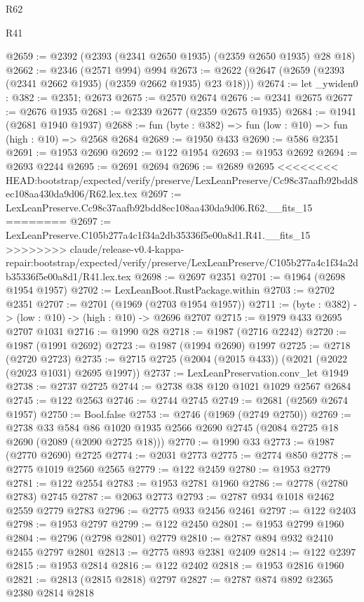 \begin{lexlean}{R62}
\begin{lexlean}{R41}
\begin{coremodule}
{{{{{{{{{{{{{{{{{{{{{{{{{{{{{{{{{{{{{{{{{{{{{{{{{{{{{{{{{{{{{{{{{{{{{{{{{{{{{{{{{{{{{{{@2659 := @2392 (@2393 (@2341 @2650 @1935) (@2359 @2650 @1935) @28 @18)
@2662 := @2346 (@2571 @994) @994
@2673 := @2622 (@2647 (@2659 (@2393 (@2341 @2662 @1935) (@2359 @2662 @1935) @23 @18)))
@2674 := let _ywiden0 : @382 := @2351; @2673
@2675 := @2570 @2674
@2676 := @2341 @2675
@2677 := @2676 @1935
@2681 := @2339 @2677 (@2359 @2675 @1935)
@2684 := @1941 (@2681 @1940 @1937)
@2688 := fun (byte : @382) => fun (low : @10) => fun (high : @10) => @2568 @2684
@2689 := @1950 @433
@2690 := @586 @2351
@2691 := @1953 @2690
@2692 := @122 @1954
@2693 := @1953 @2692
@2694 := @2693 @2244
@2695 := @2691 @2694
@2696 := @2689 @2695
<<<<<<<< HEAD:bootstrap/expected/verify/preserve/LexLeanPreserve/Cc98c37aafb92bdd8ec108aa430da9d06/R62.lex.tex
@2697 := LexLeanPreserve.Cc98c37aafb92bdd8ec108aa430da9d06.R62.__fits_15
========
@2697 := LexLeanPreserve.C105b277a4c1f34a2db35336f5e00a8d1.R41.__fits_15
>>>>>>>> claude/release-v0.4-kappa-repair:bootstrap/expected/verify/preserve/LexLeanPreserve/C105b277a4c1f34a2db35336f5e00a8d1/R41.lex.tex
@2698 := @2697 @2351
@2701 := @1964 (@2698 @1954 @1957)
@2702 := LexLeanBoot.RustPackage.within
@2703 := @2702 @2351
@2707 := @2701 (@1969 (@2703 @1954 @1957))
@2711 := (byte : @382) -> (low : @10) -> (high : @10) -> @2696 @2707
@2715 := @1979 @433 @2695 @2707 @1031
@2716 := @1990 @28
@2718 := @1987 (@2716 @2242)
@2720 := @1987 (@1991 @2692)
@2723 := @1987 (@1994 @2690) @1997
@2725 := @2718 (@2720 @2723)
@2735 := @2715 @2725 (@2004 (@2015 @433)) (@2021 (@2022 (@2023 @1031) @2695 @1997))
@2737 := LexLeanPreservation.conv_let @1949
@2738 := @2737 @2725
@2744 := @2738 @38 @120 @1021 @1029 @2567 @2684
@2745 := @122 @2563
@2746 := @2744 @2745
@2749 := @2681 (@2569 @2674 @1957)
@2750 := Bool.false
@2753 := @2746 (@1969 (@2749 @2750))
@2769 := @2738
    @33
    @584
    @86
    @1020
    @1935
    @2566
    @2690
    @2745
    (@2084 @2725 @18 @2690 (@2089 (@2090 @2725 @18)))
@2770 := @1990 @33
@2773 := @1987 (@2770 @2690) @2725
@2774 := @2031 @2773
@2775 := @2774 @850
@2778 := @2775 @1019 @2560 @2565
@2779 := @122 @2459
@2780 := @1953 @2779
@2781 := @122 @2554
@2783 := @1953 @2781 @1960
@2786 := @2778 (@2780 @2783) @2745
@2787 := @2063 @2773
@2793 := @2787 @934 @1018 @2462 @2559 @2779 @2783
@2796 := @2775 @933 @2456 @2461
@2797 := @122 @2403
@2798 := @1953 @2797
@2799 := @122 @2450
@2801 := @1953 @2799 @1960
@2804 := @2796 (@2798 @2801) @2779
@2810 := @2787 @894 @932 @2410 @2455 @2797 @2801
@2813 := @2775 @893 @2381 @2409
@2814 := @122 @2397
@2815 := @1953 @2814
@2816 := @122 @2402
@2818 := @1953 @2816 @1960
@2821 := @2813 (@2815 @2818) @2797
@2827 := @2787 @874 @892 @2365 @2380 @2814 @2818
}}}}}}}}}}}}}}}}}}}}}}}}}}}}}}}}}}}}}}}}}}}}}}}}}}}}}}}}}}}}}}}}}}}}}}}}}}}}}}}}}}}}}}}
\end{coremodule}
\end{lexlean}
\end{lexlean}

